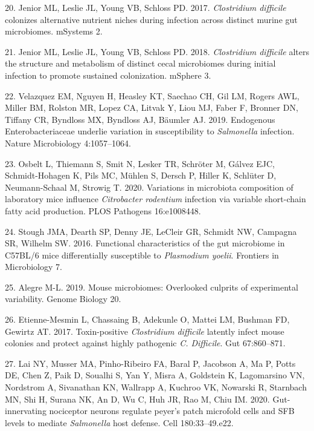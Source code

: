 \documentclass[
  11pt,
]{article}
\begin{document}
\leavevmode\hypertarget{ref-Jenior2017}{}%
20. Jenior ML, Leslie JL, Young VB, Schloss PD. 2017. \emph{Clostridium
difficile} colonizes alternative nutrient niches during infection across
distinct murine gut microbiomes. mSystems 2.

\leavevmode\hypertarget{ref-Jenior2018}{}%
21. Jenior ML, Leslie JL, Young VB, Schloss PD. 2018. \emph{Clostridium
difficile} alters the structure and metabolism of distinct cecal
microbiomes during initial infection to promote sustained colonization.
mSphere 3.

\leavevmode\hypertarget{ref-Velazquez2019}{}%
22. Velazquez EM, Nguyen H, Heasley KT, Saechao CH, Gil LM, Rogers AWL,
Miller BM, Rolston MR, Lopez CA, Litvak Y, Liou MJ, Faber F, Bronner DN,
Tiffany CR, Byndloss MX, Byndloss AJ, Bäumler AJ. 2019. Endogenous
Enterobacteriaceae underlie variation in susceptibility to
\emph{Salmonella} infection. Nature Microbiology 4:1057--1064.

\leavevmode\hypertarget{ref-Osbelt2020}{}%
23. Osbelt L, Thiemann S, Smit N, Lesker TR, Schröter M, Gálvez EJC,
Schmidt-Hohagen K, Pils MC, Mühlen S, Dersch P, Hiller K, Schlüter D,
Neumann-Schaal M, Strowig T. 2020. Variations in microbiota composition
of laboratory mice influence \emph{Citrobacter rodentium} infection via
variable short-chain fatty acid production. PLOS Pathogens 16:e1008448.

\leavevmode\hypertarget{ref-Stough2016}{}%
24. Stough JMA, Dearth SP, Denny JE, LeCleir GR, Schmidt NW, Campagna
SR, Wilhelm SW. 2016. Functional characteristics of the gut microbiome
in C57BL/6 mice differentially susceptible to \emph{Plasmodium yoelii}.
Frontiers in Microbiology 7.

\leavevmode\hypertarget{ref-Alegre2019}{}%
25. Alegre M-L. 2019. Mouse microbiomes: Overlooked culprits of
experimental variability. Genome Biology 20.

\leavevmode\hypertarget{ref-EtienneMesmin2017}{}%
26. Etienne-Mesmin L, Chassaing B, Adekunle O, Mattei LM, Bushman FD,
Gewirtz AT. 2017. Toxin-positive \emph{Clostridium difficile} latently
infect mouse colonies and protect against highly pathogenic \emph{C.
Difficile}. Gut 67:860--871.

\leavevmode\hypertarget{ref-Lai2020}{}%
27. Lai NY, Musser MA, Pinho-Ribeiro FA, Baral P, Jacobson A, Ma P,
Potts DE, Chen Z, Paik D, Soualhi S, Yan Y, Misra A, Goldstein K,
Lagomarsino VN, Nordstrom A, Sivanathan KN, Wallrapp A, Kuchroo VK,
Nowarski R, Starnbach MN, Shi H, Surana NK, An D, Wu C, Huh JR, Rao M,
Chiu IM. 2020. Gut-innervating nociceptor neurons regulate peyer's patch
microfold cells and SFB levels to mediate \emph{Salmonella} host
defense. Cell 180:33--49.e22.
\end{document}
